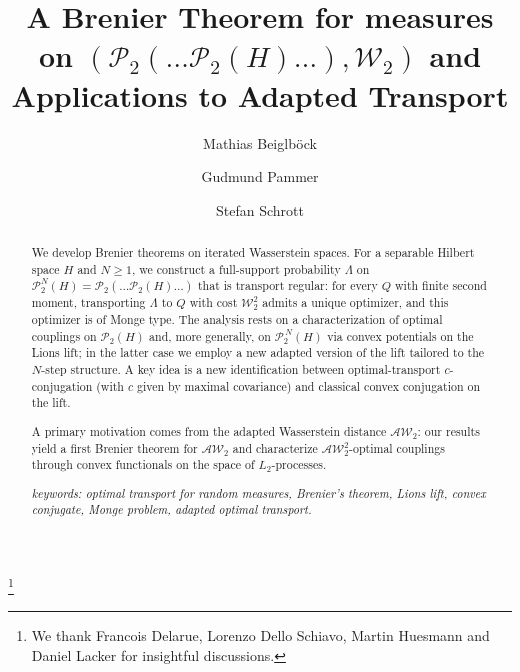 \documentclass[a4paper]{amsart}
\numberwithin{theorem}{section}
\theoremstyle{definition}
\newcommand{\W}{\mathcal{W}}
\newcommand{\AW}{\mathcal{AW}}
\newcommand{\Pc}{\mathcal P}
\renewcommand{\H}{H}
\begin{document}
\begin{abstract}
We develop Brenier theorems on iterated Wasserstein spaces. For a separable Hilbert space $H$ and $N\ge 1$, we construct a full-support probability $\Lambda$ on $\mathcal{P}_2^{N}(H)= \Pc_2(\ldots \Pc_2(\H)\ldots) $ that is transport regular: for every $Q$ with finite second moment, transporting $\Lambda$ to $Q$ with cost $\W_2^2$ admits a unique optimizer, and this optimizer is of Monge type. The analysis rests on a characterization of optimal couplings on $\mathcal{P}_2(H)$ and, more generally, on $\mathcal{P}_2^{\,N}(H)$ via convex potentials on the Lions lift; in the latter case we employ a new adapted version of the lift tailored to the $N$-step structure. A key idea is a new identification between optimal-transport $c$-conjugation (with $c$ given by maximal covariance) and classical convex conjugation on the lift.

A primary motivation comes from the adapted Wasserstein distance $\AW_2$: our results yield a first Brenier theorem for $\AW_2$ and characterize $\AW_2^2$-optimal couplings through convex functionals on the space of $L_2$-processes.





\medskip

\noindent\emph{keywords: optimal transport for random measures, Brenier's theorem, Lions lift, convex conjugate, Monge problem, adapted optimal transport.}
\end{abstract}



\title[A Brenier Theorem on $(\Pc_2(\ldots \Pc_2(\H)\ldots), \W_2 )$  and  Adapted Transport]{A Brenier Theorem for measures on  $ (\Pc_2(\ldots \Pc_2(\H)\ldots), \W_2 )$ and Applications to Adapted Transport}
\author{Mathias Beiglböck}
\author{Gudmund Pammer}
\author{Stefan Schrott}
\thanks{We thank Francois Delarue, Lorenzo Dello Schiavo, Martin Huesmann and Daniel Lacker for insightful discussions. 
}

\maketitle
\end{document}
